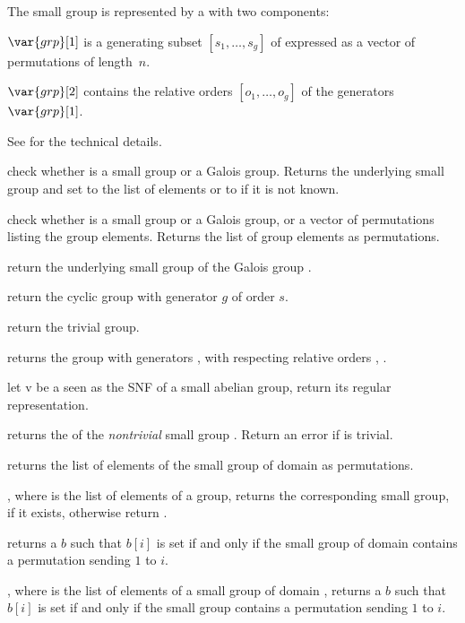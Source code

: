 The small group  is represented by a  with two
components:

$\var{grp}[1]$ is a generating subset $[s_1,\ldots,s_g]$ of 
expressed as a vector of permutations of length~$n$.

$\var{grp}[2]$ contains the relative orders $[o_1,\ldots,o_g]$ of
the generators $\var{grp}[1]$.

See  for the technical details.

 check whether  is a
small group or a Galois group. Returns the underlying small
group and set  to the list of elements or to  if it is not
known.

check whether  is a small group or a Galois group, or a vector of
permutations listing the group elements. Returns the list of group elements as
permutations.

 return the underlying small group of the
Galois group .

 return the cyclic group with generator
$g$ of order $s$.

 return the trivial group.

 returns the group
with generators ,  with respecting relative orders ,
.

 let v be a  seen as the SNF of
a small abelian group, return its regular representation.

 returns the  of the
\emph{nontrivial} small group . Return an error if  is
trivial.

 returns the list of elements of the
small group  of domain  as permutations.

, where  is the list of
elements of a group, returns the corresponding small group, if it
exists, otherwise return .

 returns a  $b$ such that
$b[i]$ is set if and only if the small group  of domain 
contains a permutation sending $1$ to $i$.

, where  is the list of
elements of a small group of domain , returns a  $b$ such that
$b[i]$ is set if and only if the small group contains a permutation sending $1$
to $i$.

